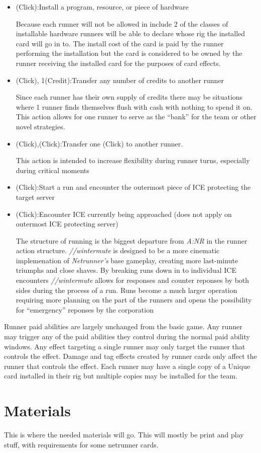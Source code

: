 \documentclass[titlepage]{article}
\begin{document}
\begin{itemize}
	\item (Click):Install a program, resource, or piece of hardware

		Because each runner will not be allowed in include 2 of the classes of installable hardware runners will be able to declare whose rig the installed card will go in to. The install cost of the card is paid by the runner performing the installation but the card is considered to be owned by the runner receiving the installed card for the purposes of card effects. 
	\item (Click), 1(Credit):Transfer any number of credits to another runner

		Since each runner has their own supply of credits there may be situations where 1 runner finds themselves flush with cash with nothing to spend it on. This action allows for one runner to serve as the ``bank'' for the team or other novel strategies.
	\item (Click),(Click):Transfer one (Click) to another runner.

		This action is intended to increase flexibility during runner turns, especially during critical moments
	\item (Click):Start a run and encounter the outermost piece of ICE protecting the target server
	\item (Click):Encounter ICE currently being approached (does not apply on outermost ICE protecting server)

		The structure of running is the biggest departure from \emph{A:NR} in the runner action structure. \emph{//wintermute} is designed to be a more cinematic implemenation of \emph{Netrunner's} base gameplay, creating more last-minute triumphs and close shaves. By breaking runs down in to individual ICE encounters \emph{//wintermute} allows for responses and counter reponses by both sides during the process of a run. Runs become a much larger operation requiring more planning on the part of the runners and opens the possibility for ``emergency'' reponses by the corporation
\end{itemize}

Runner paid abilities are largely unchanged from the basic game. Any runner may trigger any of the paid abilities they control during the normal paid ability windows. Any effect targeting a single runner may only target the runner that controls the effect. Damage and tag effects created by runner cards only affect the runner that controls the effect. Each runner may have a single copy of a Unique card installed in their rig but multiple copies may be installed for the team.
\section{Materials}
This is where the needed materials will go. This will mostly be print and play stuff, with requirements for some netrunner cards.
\end{document}
